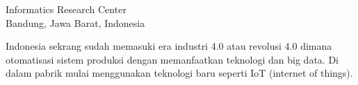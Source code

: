 

{Informatics Research Center\\
Bandung, Jawa Barat, Indonesia}

Indonesia sekrang sudah memasuki era industri 4.0 atau revolusi 4.0 dimana otomatisasi sistem produksi dengan memanfaatkan teknologi dan big data. Di dalam pabrik mulai menggunakan teknologi baru seperti IoT (internet of things).
